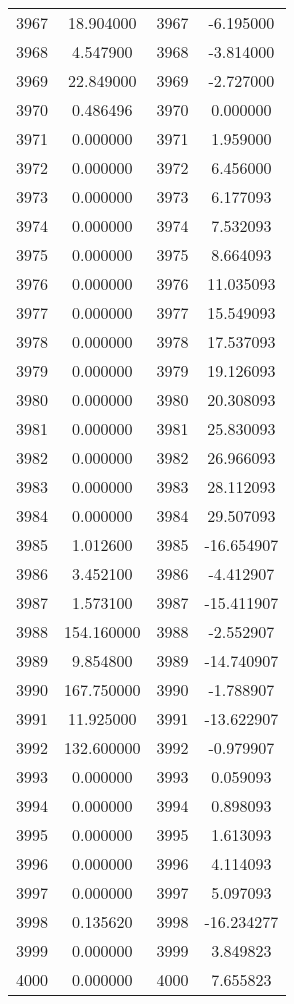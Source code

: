 \documentclass[12pt]{article}
\begin{document}
\begin{longtable}{@{}cccc@{}}
3967 & 18.904000 & 3967 & -6.195000 \\
3968 & 4.547900 & 3968 & -3.814000 \\
3969 & 22.849000 & 3969 & -2.727000 \\
3970 & 0.486496 & 3970 & 0.000000 \\
3971 & 0.000000 & 3971 & 1.959000 \\
3972 & 0.000000 & 3972 & 6.456000 \\
3973 & 0.000000 & 3973 & 6.177093 \\
3974 & 0.000000 & 3974 & 7.532093 \\
3975 & 0.000000 & 3975 & 8.664093 \\
3976 & 0.000000 & 3976 & 11.035093 \\
3977 & 0.000000 & 3977 & 15.549093 \\
3978 & 0.000000 & 3978 & 17.537093 \\
3979 & 0.000000 & 3979 & 19.126093 \\
3980 & 0.000000 & 3980 & 20.308093 \\
3981 & 0.000000 & 3981 & 25.830093 \\
3982 & 0.000000 & 3982 & 26.966093 \\
3983 & 0.000000 & 3983 & 28.112093 \\
3984 & 0.000000 & 3984 & 29.507093 \\
3985 & 1.012600 & 3985 & -16.654907 \\
3986 & 3.452100 & 3986 & -4.412907 \\
3987 & 1.573100 & 3987 & -15.411907 \\
3988 & 154.160000 & 3988 & -2.552907 \\
3989 & 9.854800 & 3989 & -14.740907 \\
3990 & 167.750000 & 3990 & -1.788907 \\
3991 & 11.925000 & 3991 & -13.622907 \\
3992 & 132.600000 & 3992 & -0.979907 \\
3993 & 0.000000 & 3993 & 0.059093 \\
3994 & 0.000000 & 3994 & 0.898093 \\
3995 & 0.000000 & 3995 & 1.613093 \\
3996 & 0.000000 & 3996 & 4.114093 \\
3997 & 0.000000 & 3997 & 5.097093 \\
3998 & 0.135620 & 3998 & -16.234277 \\
3999 & 0.000000 & 3999 & 3.849823 \\
4000 & 0.000000 & 4000 & 7.655823 \\

\end{longtable}
\end{document}
